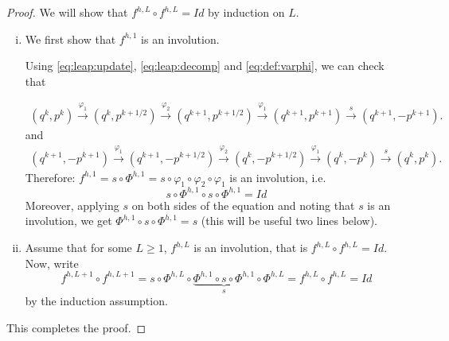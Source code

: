 \documentclass[english,graybox,envcountchap,envcountsame,sectrefs,shortlabels]{svmono}
\theoremstyle{style}
\newenvironment{svmultproof}{\small \begin{proof}}{\end{proof}}
\begin{document}
\begin{svmultproof}
We will show that $f^{h,L} \circ f^{h,L}=Id$ by induction on $L$.

\begin{enumerate}[(i)]
\item We first show that $f^{h,1}$ is an involution.

Using \eqref{eq:leap:update}, \eqref{eq:leap:decomp} and \eqref{eq:def:varphi}, we can check that

\begin{align*}
(q^k,p^k) \stackrel{\varphi_1}{\longrightarrow} (q^k,p^{k+1/2}) \stackrel{\varphi_2}{\longrightarrow} (q^{k+1},p^{k+1/2}) \stackrel{\varphi_1}{\longrightarrow} (q^{k+1},p^{k+1}) \stackrel{s}{\longrightarrow} (q^{k+1},-p^{k+1}).
\end{align*}
and
\begin{align*}
(q^{k+1},-p^{k+1}) \stackrel{\varphi_1}{\longrightarrow} (q^{k+1},-p^{k+1/2}) \stackrel{\varphi_2}{\longrightarrow} (q^{k},-p^{k+1/2}) \stackrel{\varphi_1}{\longrightarrow} (q^{k},-p^{k}) \stackrel{s}{\longrightarrow} (q^{k},p^{k}).
\end{align*}
Therefore: $f^{h,1}=s\circ \Phi^{h,1}=s \circ \varphi_1 \circ \varphi_2 \circ \varphi_1$ is an involution, i.e.
$$
s\circ \Phi^{h,1} \circ s\circ \Phi^{h,1}=Id
$$
Moreover, applying $s$ on both sides of the equation and noting that $s$ is an involution, we get $\Phi^{h,1} \circ s\circ \Phi^{h,1}=s$ (this will be useful two lines below).
\item Assume that for some $L\geq 1$, $f^{h,L}$ is an involution, that is $f^{h,L} \circ f^{h,L}=Id$. Now, write
$$
f^{h,L+1} \circ f^{h,L+1}=s\circ \Phi^{h,L} \circ \underbrace{\Phi^{h,1} \circ s \circ \Phi^{h,1}}_{s} \circ \Phi^{h,L} =f^{h,L} \circ f^{h,L}=Id
$$
by the induction assumption.
\end{enumerate}
This completes the proof.
\end{svmultproof}
\end{document}
